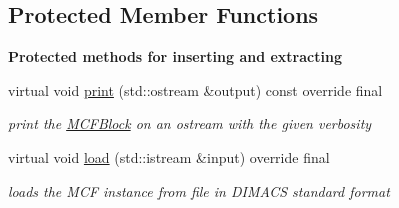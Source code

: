 \subsection*{Protected Member Functions}
\begin{Indent}\textbf{ Protected methods for inserting and extracting}\par
\begin{DoxyCompactItemize}
\item 
virtual void \mbox{\hyperlink{class_s_m_spp__di__unipi__it_1_1_m_c_f_block_a617885c1d228e0ca67bbb0efdbe713e3}{print}} (std\+::ostream \&output) const override final
\begin{DoxyCompactList}\small\item\em print the \mbox{\hyperlink{class_s_m_spp__di__unipi__it_1_1_m_c_f_block}{M\+C\+F\+Block}} on an ostream with the given verbosity \end{DoxyCompactList}\item 
virtual void \mbox{\hyperlink{class_s_m_spp__di__unipi__it_1_1_m_c_f_block_a221601b23896f7a98c6914f42224d446}{load}} (std\+::istream \&input) override final
\begin{DoxyCompactList}\small\item\em loads the M\+CF instance from file in D\+I\+M\+A\+CS standard format \end{DoxyCompactList}\end{DoxyCompactItemize}
\end{Indent}
